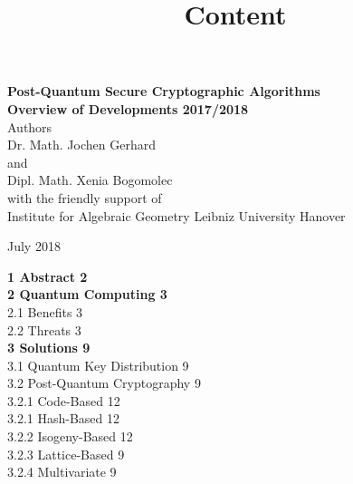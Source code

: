 \documentclass[a4paper,11pt]{article}
\begin{document}
\begin{titlepage}
\begin{center}

{\Huge{\textbf{Post-Quantum Secure Cryptographic Algorithms}}}\\[2cm]

\huge{\textbf{Overview of Developments 2017/2018}}\\[1cm]

\large{Authors}\\[0,2cm]
 
\Large{Dr. Math. Jochen Gerhard}\\ [0,2cm] 

\large{and }\\[0,2cm] 

\Large{Dipl. Math. Xenia Bogomolec}\\ [1,4cm] 

\large{with the friendly support of}\\[0,2cm]

\Large{Institute for Algebraic Geometry Leibniz University Hanover}\\[1cm]


 
\vspace{1cm}
 
\large{July 2018}
\end{center}
\end{titlepage}


\title{\textbf{\Large{Content}}}
\maketitle


\noindent
\textbf{1 Abstract \hfill 2}\\[0,5cm]
\textbf{2 Quantum Computing \hfill 3}\\[0,3cm]
	\hspace*{0,5cm}2.1 Benefits \hfill 3\\[0,3cm]
	\hspace*{0,5cm}2.2 Threats \hfill 3\\[0,3cm]
\textbf{3 Solutions \hfill 9}\\[0,3cm]
	\hspace*{0,5cm}3.1 Quantum Key Distribution \hfill 9\\[0,3cm]
	\hspace*{0,5cm}3.2 Post-Quantum Cryptography \hfill 9\\[0,3cm]
		\hspace*{1cm}3.2.1 Code-Based \hfill 12\\[0,3cm]
		\hspace*{1cm}3.2.1 Hash-Based \hfill 12\\[0,3cm]
		\hspace*{1cm}3.2.2 Isogeny-Based \hfill 12\\[0,3cm]
		\hspace*{1cm}3.2.3 Lattice-Based \hfill 9\\[0,3cm]
		\hspace*{1cm}3.2.4 Multivariate \hfill 9\\[0,3cm]
\end{document}

